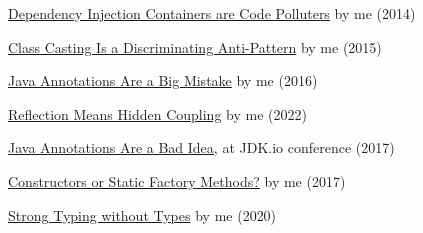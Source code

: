 \documentclass{article}
\begin{document}

\href{https://www.yegor256.com/2014/10/03/di-containers-are-evil.html}{Dependency Injection Containers are Code Polluters} by me (2014)

\href{https://www.yegor256.com/2015/04/02/class-casting-is-anti-pattern.html}{Class Casting Is a Discriminating Anti-Pattern} by me (2015)

\href{https://www.yegor256.com/2016/04/12/java-annotations-are-evil.html}{Java Annotations Are a Big Mistake} by me (2016)

\href{https://www.yegor256.com/2022/06/05/reflection-means-hidden-coupling.html}{Reflection Means Hidden Coupling} by me (2022)

\href{https://www.youtube.com/watch?v=cv23Z6xpwDw}{Java Annotations Are a Bad Idea}, at JDK.io conference (2017)

\href{https://www.yegor256.com/2017/11/14/static-factory-methods.html}{Constructors or Static Factory Methods?} by me (2017)

\href{https://www.yegor256.com/2020/11/10/typing-without-types.html}{Strong Typing without Types} by me (2020)
\end{document}
